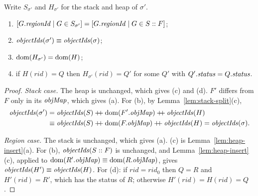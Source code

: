 \begin{lemma}
\label{lem:fieldAsgn-shape}
Write $S_{\sigma'}$ and $H_{\sigma'}$ for the stack and heap of $\sigma'$.
\begin{enumerate}[nosep,label=(\alph*)]
  \item $[G.\mathit{regionId} \mid G \in S_{\sigma'}] = [G.\mathit{regionId} \mid G \in S :: F]$;
  \item $\mathit{objectIds}(\sigma') \equiv \mathit{objectIds}(\sigma)$; 
  \item $\mathrm{dom}(H_{\sigma'}) = \mathrm{dom}(H)$; 
  \item if $H(rid) = Q$ then $H_{\sigma'}(rid) = Q'$ for some $Q'$ with $Q'.\mathit{status} = Q.\mathit{status}$.
\end{enumerate}
\end{lemma}
\begin{proof}
\emph{Stack case.} The heap is unchanged, which gives (c) and (d). $F'$ differs from $F$ only in its
$\mathit{objMap}$, which gives (a). For (b), by Lemma~\ref{lem:stack-split}(c),
\begin{align*}
  \oids(\sigma') &= \oids(S) \cat \dom(F'.\omap) \cat \oids(H) \\
  &\perm \oids(S) \cat \dom(F.\omap) \cat \oids(H) = \oids(\sigma).
\end{align*}

\emph{Region case.} The stack is unchanged, which gives (a). (c) is
Lemma~\ref{lem:heap-insert}(a). For (b), $\mathit{objectIds}(S :: F)$ is unchanged, and
Lemma~\ref{lem:heap-insert}(c), applied to $\mathrm{dom}(R'.\mathit{objMap}) \equiv \mathrm{dom}(R.\mathit{objMap})$, gives
$\mathit{objectIds}(H') \equiv \mathit{objectIds}(H)$. For (d): if
$rid = rid_0$ then $Q = R$ and $H'(rid) = R'$, which has the status of $R$; otherwise
$H'(rid) = H(rid) = Q$.
\end{proof}


